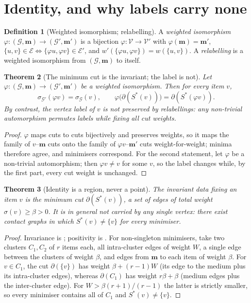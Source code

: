 \documentclass[11pt,twocolumn,a4paper]{article}
\newtheorem{theorem}{Theorem}[section]
\theoremstyle{definition}
\newtheorem{definition}[theorem]{Definition}
\theoremstyle{remark}
\newcommand{\Gph}{\mathcal{G}}
\newcommand{\V}{\mathcal{V}}
\newcommand{\E}{\mathcal{E}}
\newcommand{\med}{\mathbf{m}}
\newcommand{\wt}{w}
\newcommand{\cut}{\partial}
\newcommand{\flo}{\beta}
\newcommand{\sep}{\sigma}
\begin{document}
\section{Identity, and why labels carry none}
\label{sec:identity}

\begin{definition}[Weighted isomorphism; relabelling]
\label{def:iso}
A \emph{weighted isomorphism} $\varphi:(\Gph,\med)\to(\Gph',\med')$ is a
bijection $\varphi:\V\to\V'$ with $\varphi(\med)=\med'$,
$\{u,v\}\in\E\iff\{\varphi u,\varphi v\}\in\E'$, and
$\wt'(\{\varphi u,\varphi v\})=\wt(\{u,v\})$. A \emph{relabelling} is a
weighted isomorphism from $(\Gph,\med)$ to itself.
\end{definition}

\begin{theorem}[The minimum cut is the invariant; the label is not]
\label{thm:invariant-cut}
Let $\varphi:(\Gph,\med)\to(\Gph',\med')$ be a weighted isomorphism. Then
for every item $v$,
\[
  \sep_{\Gph'}(\varphi v)=\sep_{\Gph}(v),
  \qquad
  \varphi\bigl(\cut(S^{*}(v))\bigr)=\cut(S^{*}(\varphi v)) .
\]
By contrast, the vertex label of $v$ is not preserved by relabellings: any
non-trivial automorphism permutes labels while fixing all cut weights.
\end{theorem}

\begin{proof}
$\varphi$ maps cuts to cuts bijectively and preserves weights, so it maps
the family of $v$--$\med$ cuts onto the family of $\varphi v$--$\med'$
cuts weight-for-weight; minima therefore agree, and minimisers correspond.
For the second statement, let $\varphi$ be a non-trivial automorphism;
then $\varphi v\ne v$ for some $v$, so the label changes while, by the
first part, every cut weight is unchanged.
\end{proof}

\begin{theorem}[Identity is a region, never a point]
\label{thm:region}
The invariant data fixing an item $v$ is the minimum cut
$\cut(S^{*}(v))$, a set of edges of total weight $\sep(v)\ge\flo>0$. It is
in general not carried by any single vertex: there exist contact graphs in
which $S^{*}(v)\ne\{v\}$ for every minimiser.
\end{theorem}

\begin{proof}
Invariance is ; positivity is .
For non-singleton minimisers, take two clusters $C_1,C_2$ of $r$ items
each, all intra-cluster edges of weight $W$, a single edge between the
clusters of weight $\flo$, and edges from $\med$ to each item of weight
$\flo$. For $v\in C_1$, the cut $\cut(\{v\})$ has weight
$\flo+(r-1)W$ (its edge to the medium plus its intra-cluster edges),
whereas $\cut(C_1)$ has weight $r\flo+\flo$ (medium edges plus the
inter-cluster edge). For $W>\flo(r+1)/(r-1)$ the latter is strictly
smaller, so every minimiser contains all of $C_1$ and $S^{*}(v)\ne\{v\}$.
\end{proof}
\end{document}
